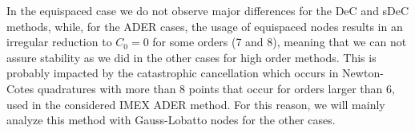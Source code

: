 In the equispaced case we do not observe major differences for the DeC and sDeC methods, 
while, for the ADER cases, the usage of equispaced nodes results in an irregular reduction to $C_0=0$ for some orders (7 and 8), meaning that we can not assure stability as we did in the other cases for high order methods. 
This is probably impacted by the catastrophic cancellation which occurs in Newton-Cotes quadratures with more than 8 points that occur for orders larger than $6$, used in the considered IMEX ADER method. 
For this reason, we will mainly analyze this method with Gauss-Lobatto nodes for the other cases.



